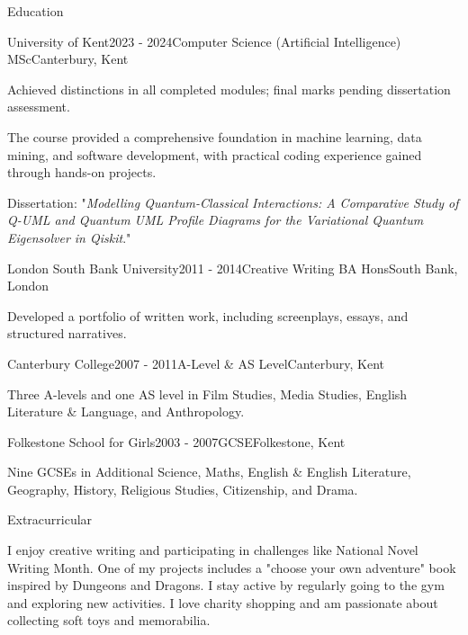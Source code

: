 \documentclass[
	11pt, %
]{resume} %
\begin{document}
\begin{rSection}{Education}

\begin{rSubsection}{University of Kent}{2023 - 2024}{Computer Science (Artificial Intelligence) MSc}{Canterbury, Kent}
    \item Achieved distinctions in all completed modules; final marks pending dissertation assessment. 
    \item The course provided a comprehensive foundation in machine learning, data mining, and software development, with practical coding experience gained through hands-on projects.
    \item Dissertation: "\textit{Modelling Quantum-Classical Interactions: A Comparative Study of Q-UML and Quantum UML Profile Diagrams for the Variational Quantum Eigensolver in Qiskit}."
\end{rSubsection}

\begin{rSubsection}{London South Bank University}{2011 - 2014}{Creative Writing BA Hons}{South Bank, London}
    \item Developed a portfolio of written work, including screenplays, essays, and structured narratives.
\end{rSubsection}

\begin{rSubsection}{Canterbury College}{2007 - 2011}{A-Level \& AS Level}{Canterbury, Kent}
    \item Three A-levels and one AS level in Film Studies, Media Studies, English Literature \& Language, and Anthropology.
\end{rSubsection}

\begin{rSubsection}{Folkestone School for Girls}{2003 - 2007}{GCSE}{Folkestone, Kent}
    \item Nine GCSEs in Additional Science, Maths, English \& English Literature, Geography, History, Religious Studies, Citizenship, and Drama.
\end{rSubsection}

\end{rSection}


\begin{rSection}{Extracurricular}

I enjoy creative writing and participating in challenges like National Novel Writing Month. One of my projects includes a "choose your own adventure" book inspired by Dungeons and Dragons. I stay active by regularly going to the gym and exploring new activities. I love charity shopping and am passionate about collecting soft toys and memorabilia. 

\end{rSection}
\end{document}
